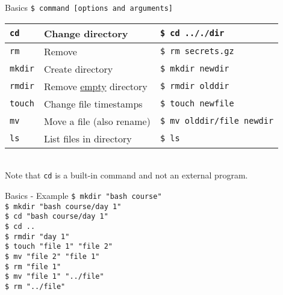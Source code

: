 \documentclass{beamer}
\let\tt\texttt
\let\ul\underline
\let\tilde\texttildelow
\begin{document}
\begin{frame}{Basics}
        \tt{\$ command [options and arguments]}  \\
        \begin{tabular}{p{} p{} | p{}}
                \hline
                \tt{cd}           &
                Change directory  &
                \tt{\$ cd .././dir}  \\
                \hline
                \tt{rm}           &
                Remove &
                \tt{\$ rm secrets.gz}  \\
                \hline
                \tt{mkdir}           &
                Create directory &
                \tt{\$ mkdir newdir}  \\
                \hline
                \tt{rmdir}           &
                Remove \ul{empty} directory &
                \tt{\$ rmdir olddir}  \\
                \hline
                \tt{touch}               &
                Change file timestamps   &
                \tt{\$ touch newfile}       \\
                \hline
                \tt{mv}                     &
                Move a file (also rename)   &
                \tt{\$ mv olddir/file newdir}  \\
                \hline
                \tt{ls}                     &
                List files in directory   &
                \tt{\$ ls \tilde}                \\
                \hline
        \end{tabular} \\
        Note that \tt{cd} is a built-in command and not an external program.
\end{frame}

\begin{frame}{Basics - Example}
        \tt{\$ mkdir "bash course"}         \\
        \tt{\$ mkdir "bash course/day 1"}   \\
        \tt{\$ cd "bash course/day 1"}      \\
        \tt{\$ cd ..}                       \\
        \tt{\$ rmdir "day 1"}               \\
        \tt{\$ touch "file 1" "file 2"}     \\
        \tt{\$ mv "file 2" "file 1"}        \\
        \tt{\$ rm "file 1"}                 \\
        \tt{\$ mv "file 1" "../file"}       \\
        \tt{\$ rm "../file"}                \\
\end{frame}
\end{document}
